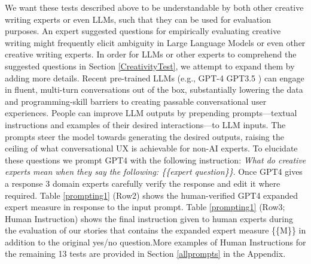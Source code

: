 We want these tests described above to be understandable by both other creative writing experts or even LLMs, such that they can be used for evaluation purposes. An expert suggested questions for empirically evaluating creative writing might frequently elicit ambiguity in Large Language Models or even other creative writing experts. In order for LLMs or other experts to comprehend the suggested questions in Section
\ref{CreativityTest}, we attempt to expand them by adding more details.
Recent pre-trained LLMs (e.g., GPT-4 \cite{OpenAI2023GPT4TR} GPT3.5 \cite{ChatGPT}) can engage in fluent, multi-turn conversations out of the box, substantially lowering the data and programming-skill barriers to creating passable conversational user experiences. People can improve LLM outputs by prepending prompts—textual instructions and examples of their desired interactions—to LLM inputs. The prompts steer the model towards generating the desired outputs, raising the ceiling of what conversational UX is achievable for non-AI experts. To elucidate these questions we prompt GPT4 with the following instruction: \textit{What do creative experts mean when they say the following: \{\{expert question\}\}}. Once GPT4 gives a response 3 domain experts carefully verify the response and edit it where required. Table \ref{prompting1} (Row2) 
shows the human-verified GPT4 expanded expert measure in response to the input prompt. Table \ref{prompting1} (Row3; Human Instruction) shows the final instruction given to human experts during the evaluation of our stories that contains the expanded expert measure \{\{M\}\} in addition to the original yes/no question.More examples of Human Instructions for the remaining 13 tests are provided in Section \ref{allprompts} in the Appendix.


